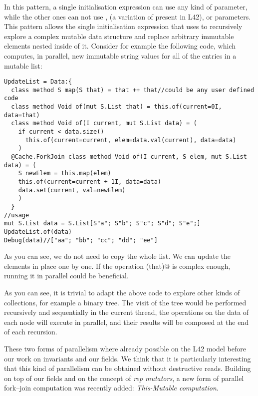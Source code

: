 In this pattern, a single initialisation expression can use any kind of parameter, while the other ones can not 
use \Q@mut@, \Q@lent@ (a variation of \Q@mut@ present in L42), or \Q@read@ parameters.
This pattern allows the single initialisation expression that uses \Q@mut@ to recursively explore a complex mutable data structure and replace arbitrary immutable elements nested inside of it.
Consider for example the following code, which computes, in parallel,
new immutable string values for all of
the entries in a mutable list:

\begin{lstlisting}[deletekeywords=label]
UpdateList = Data:{
  class method S map(S that) = that ++ that//could be any user defined code
  class method Void of(mut S.List that) = this.of(current=0I, data=that)  
  class method Void of(I current, mut S.List data) = (
    if current < data.size() 
      this.of(current=current, elem=data.val(current), data=data)
    )
  @Cache.ForkJoin class method Void of(I current, S elem, mut S.List data) = (
    S newElem = this.map(elem)
    this.of(current=current + 1I, data=data)
    data.set(current, val=newElem)
    )
  }
//usage
mut S.List data = S.List[S"a"; S"b"; S"c"; S"d"; S"e";]
UpdateList.of(data)
Debug(data)//["aa"; "bb"; "cc"; "dd"; "ee"]
\end{lstlisting}
As you can see, we do not need to copy the whole list. We can update the elements in place one by one.
If the operation \Q@map(that)@ is complex enough, running it in parallel could be beneficial.

As you can see, it is trivial to adapt the above code to explore other kinds of collections, for example a binary tree.
The visit of the tree would be performed recursively and sequentially in the current thread, the operations on the data of each node will execute in parallel, and their results will be composed at the end of each recursion.

These two forms of parallelism where already possible on the L42 model before our work on invariants and our \Q@rep@ fields.
We think that it is particularly interesting that this kind of parallelism can be obtained without destructive reads.
Building on top of our \Q@rep@ fields and on the concept of \emph{rep mutators}, a new form of parallel fork--join computation was recently added:
\emph{This-Mutable computation}.

